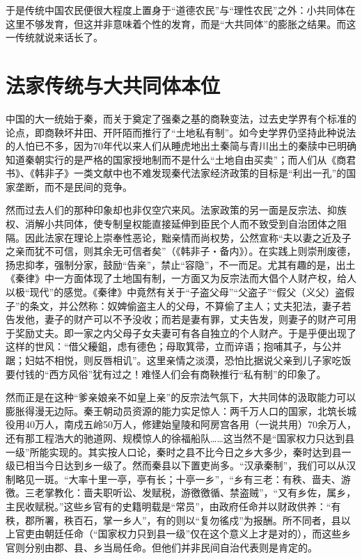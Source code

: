 \documentclass[a4paper,12pt,punct=kaiming,fontset=none]{ctexart}
\begin{document}
于是传统中国农民便很大程度上置身于“道德农民”与“理性农民”之外：小共同体在这里不够发育，但这并非意味着个性的发育，而是“大共同体”的膨胀之结果。而这一传统就说来话长了。

\section*{法家传统与大共同体本位}

中国的大一统始于秦，而关于奠定了强秦之基的商鞅变法，过去史学界有个标准的论点，即商鞅坏井田、开阡陌而推行了“土地私有制”。如今史学界仍坚持此种说法的人怕已不多，因为70年代以来人们从睡虎地出土秦简与青川出土的秦牍中已明确知道秦朝实行的是严格的国家授地制而不是什么“土地自由买卖”；而人们从《商君书》、《韩非子》一类文献中也不难发现秦代法家经济政策的目标是“利出一孔”的国家垄断，而不是民间的竞争。

然而过去人们的那种印象却也非仅空穴来风。法家政策的另一面是反宗法、抑族权、消解小共同体，使专制皇权能直接延伸到臣民个人而不致受到自治团体之阻隔。因此法家在理论上崇奉性恶论，黜亲情而尚权势，公然宣称“夫以妻之近及子之亲而犹不可信，则其余无可信者矣”（《韩非子・备内》）。在实践上则崇刑废德，扬忠抑孝，强制分家，鼓励“告亲”，禁止“容隐”，不一而足。尤其有趣的是，出土《秦律》中一方面体现了土地国有制，一方面又为反宗法而大倡个人财产权，给人以极“现代”的感觉。《秦律》中竟然有关于“子盗父母”“父盗子”“假父（义父）盗假子”的条文，并公然称：奴婢偷盗主人的父母，不算偷了主人；丈夫犯法，妻子若告发他，妻子的财产可以不予没收；而若是妻有罪，丈夫告发，则妻子的财产可用于奖励丈夫。即一家之内父母子女夫妻可有各自独立的个人财产。于是乎便出现了这样的世风：“借父耰鉏，虑有德色；母取箕帚，立而谇语；抱哺其子，与公并踞；妇姑不相悦，则反唇相讥”。这里亲情之淡漠，恐怕比据说父亲到儿子家吃饭要付钱的“西方风俗”犹有过之！难怪人们会有商鞅推行“私有制”的印象了。

然而正是在这种“爹亲娘亲不如皇上亲”的反宗法气氛下，大共同体的汲取能力可以膨胀得漫无边际。秦王朝动员资源的能力实足惊人：两千万人口的国家，北筑长城役用40万人，南戍五岭50万人，修建始皇陵和阿房宫各用（一说共用）70余万人，还有那工程浩大的驰道网、规模惊人的徐福船队……这当然不是“国家权力只达到县一级”所能实现的。其实按人口论，秦时之县不比今日之乡大多少，秦时达到县一级已相当今日达到乡一级了。然而秦县以下置吏尚多。“汉承秦制”，我们可以从汉制略见一斑。“大率十里一亭，亭有长；十亭一乡”，“乡有三老：有秩、啬夫、游徼。三老掌教化：啬夫职听讼、发赋税，游徼徼循、禁盗贼”，“又有乡佐，属乡，主民收赋税。”这些乡官有的史籍明载是“常员”，由政府任命并以财政供养：“有秩，郡所署，秩百石，掌一乡人”，有的则以“复勿徭戍”为报酬。所不同者，县以上官吏由朝廷任命（“国家权力只到县一级”仅在这个意义上才是对的），而这些乡官则分别由郡、县、乡当局任命。但他们并非民间自治代表则是肯定的。
\end{document}
